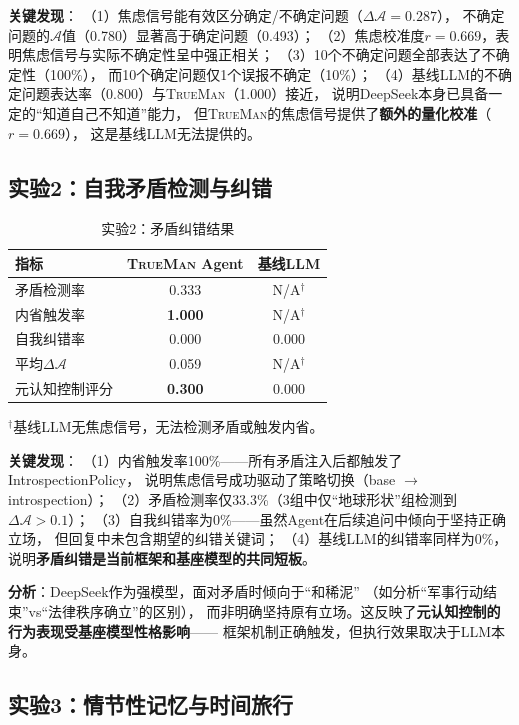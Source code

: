 \documentclass[11pt,a4paper]{article}
\newcommand{\TrueMan}{\textsc{TrueMan}}
\newcommand{\anxiety}{\mathcal{A}}
\begin{document}
\textbf{关键发现}：
（1）焦虑信号能有效区分确定/不确定问题（$\Delta\anxiety = 0.287$），
不确定问题的$\anxiety$值（0.780）显著高于确定问题（0.493）；
（2）焦虑校准度$r=0.669$，表明焦虑信号与实际不确定性呈中强正相关；
（3）10个不确定问题全部表达了不确定性（100\%），
而10个确定问题仅1个误报不确定（10\%）；
（4）基线LLM的不确定问题表达率（0.800）与\TrueMan{}（1.000）接近，
说明DeepSeek本身已具备一定的``知道自己不知道''能力，
但\TrueMan{}的焦虑信号提供了\textbf{额外的量化校准}（$r=0.669$），
这是基线LLM无法提供的。

\subsection{实验2：自我矛盾检测与纠错}

\begin{table}[htbp]
\centering
\caption{实验2：矛盾纠错结果}
\label{tab:exp2_results}
\begin{tabular}{lcc}
\toprule
指标 & \TrueMan{} Agent & 基线LLM \\
\midrule
矛盾检测率 & 0.333 & N/A$^\dagger$ \\
内省触发率 & \textbf{1.000} & N/A$^\dagger$ \\
自我纠错率 & 0.000 & 0.000 \\
平均$\Delta\anxiety$ & 0.059 & N/A$^\dagger$ \\
\midrule
元认知控制评分 & \textbf{0.300} & 0.000 \\
\bottomrule
\end{tabular}
\begin{flushleft}
\scriptsize $^\dagger$基线LLM无焦虑信号，无法检测矛盾或触发内省。
\end{flushleft}
\end{table}

\textbf{关键发现}：
（1）内省触发率100\%——所有矛盾注入后都触发了IntrospectionPolicy，
说明焦虑信号成功驱动了策略切换（base $\rightarrow$ introspection）；
（2）矛盾检测率仅33.3\%（3组中仅``地球形状''组检测到$\Delta\anxiety > 0.1$）；
（3）自我纠错率为0\%——虽然Agent在后续追问中倾向于坚持正确立场，
但回复中未包含期望的纠错关键词；
（4）基线LLM的纠错率同样为0\%，说明\textbf{矛盾纠错是当前框架和基座模型的共同短板}。

\textbf{分析}：DeepSeek作为强模型，面对矛盾时倾向于``和稀泥''
（如分析``军事行动结束''vs``法律秩序确立''的区别），
而非明确坚持原有立场。这反映了\textbf{元认知控制的行为表现受基座模型性格影响}——
框架机制正确触发，但执行效果取决于LLM本身。

\subsection{实验3：情节性记忆与时间旅行}
\end{document}
